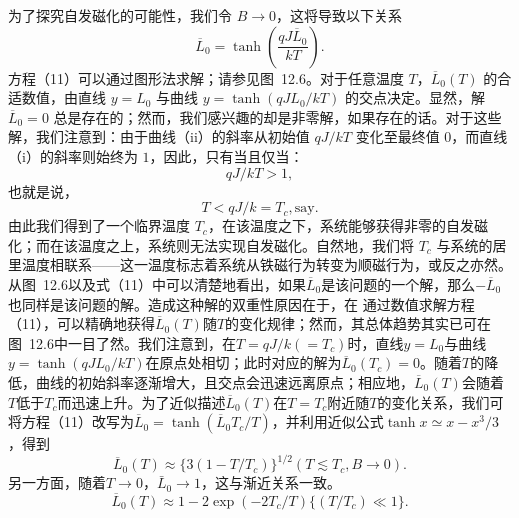 为了探究自发磁化的可能性，我们令 \(B \rightarrow 0\)，这将导致以下关系
\begin{equation}\tag{12.5.11}\label{eq:12.5.11}
\overline { { L } } _ { 0 } = \operatorname { t a n h } \left( \frac { q J \overline { { L } } _ { 0 } } { k T } \right) .
\end{equation}
方程（11）可以通过图形法求解；请参见图~12.6。对于任意温度 \(T\)，\(\overline{L}_{0}(T)\) 的合适数值，由直线 \(y=L_{0}\) 与曲线 \(y=\tanh(qJL_{0}/kT)\) 的交点决定。显然，解 \(\overline{L}_{0}=0\) 总是存在的；然而，我们感兴趣的却是非零解，如果存在的话。对于这些解，我们注意到：由于曲线（ii）的斜率从初始值 \(qJ/kT\) 变化至最终值 \(0\)，而直线（i）的斜率则始终为 \(1\)，因此，只有当且仅当：
\begin{equation}\tag{12.5.12}\label{eq:12.5.12}
q J / k T > 1 ,
\end{equation}
也就是说，
\begin{equation}\tag{12.5.13}\label{eq:12.5.13}
T < q J / k = T _ { c } ,  \mathrm { s a y } .
\end{equation}
由此我们得到了一个临界温度 \(T_{c}\)，在该温度之下，系统能够获得非零的自发磁化；而在该温度之上，系统则无法实现自发磁化。自然地，我们将 \(T_{c}\) 与系统的居里温度相联系——这一温度标志着系统从铁磁行为转变为顺磁行为，或反之亦然。
从图~12.6以及式（11）中可以清楚地看出，如果\(\overline{L}_0\)是该问题的一个解，那么\(-\overline{L}_0\)也同样是该问题的解。造成这种解的双重性原因在于，在
通过数值求解方程（11），可以精确地获得\(\overline{L}_{0}(T)\)随\(T\)的变化规律；然而，其总体趋势其实已可在图~12.6中一目了然。我们注意到，在\(T=qJ/k(=T_{c})\)时，直线\(y=L_{0}\)与曲线\(y=\tanh(qJL_{0}/kT)\)在原点处相切；此时对应的解为\(\overline{L}_{0}(T_{c})=0\)。随着\(T\)的降低，曲线的初始斜率逐渐增大，且交点会迅速远离原点；相应地，\(\overline{L}_{0}(T)\)会随着\(T\)低于\(T_{c}\)而迅速上升。为了近似描述\(\overline{L}_{0}(T)\)在\(T=T_{c}\)附近随\(T\)的变化关系，我们可将方程（11）改写为\(\overline{L}_{0}=\tanh(\overline{L}_{0}T_{c}/T)\)，并利用近似公式\(\tanh x\simeq x-x^{3}/3\)，得到
\begin{equation}\tag{12.5.14}\label{eq:12.5.14}
\overline { { L } } _ { 0 } ( T ) \approx \{ 3 ( 1 - T / T _ { c } ) \} ^{1 / 2}  ( T \lesssim T _ { c } , B \rightarrow 0 ) .
\end{equation}
另一方面，随着\(T \to 0\)，\(\bar{L}_0 \to 1\)，这与渐近关系一致。
\begin{equation}\tag{12.5.15}\label{eq:12.5.15}
\overline { { L } } _ { 0 } ( T ) \approx 1 - 2 \exp ( - 2 T _ { c } / T )  \{ ( T / T _ { c } ) \ll 1 \} .
\end{equation}
